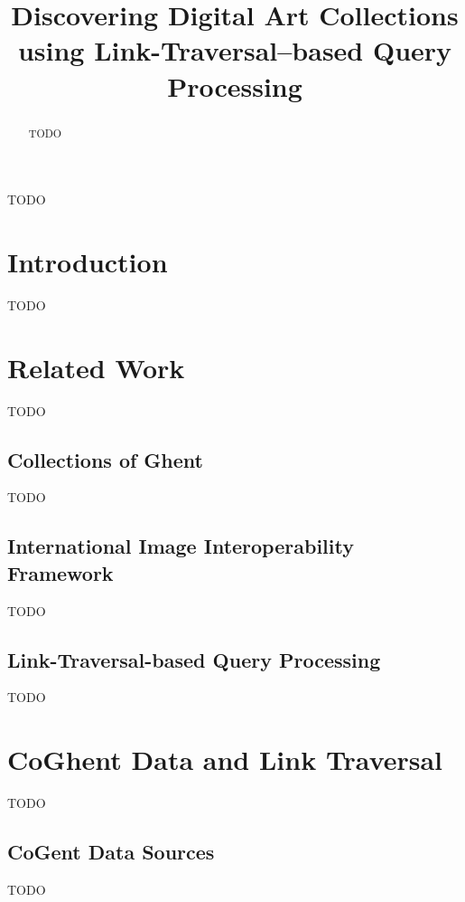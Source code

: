 \documentclass[conference]{IEEEtran}
\begin{document}

\title{Discovering Digital Art Collections using Link-Traversal–based Query Processing}

\author{
}

\maketitle

\begin{abstract}
TODO
\end{abstract}

\begin{IEEEkeywords}
TODO
\end{IEEEkeywords}

\section*{Introduction}
TODO

\section{Related Work}
TODO

\subsection{Collections of Ghent}
TODO

\subsection{International Image Interoperability Framework}
TODO

\subsection{Link-Traversal-based Query Processing}
TODO

\section{CoGhent Data and Link Traversal}
TODO

\subsection{CoGent Data Sources}
TODO
\end{document}
